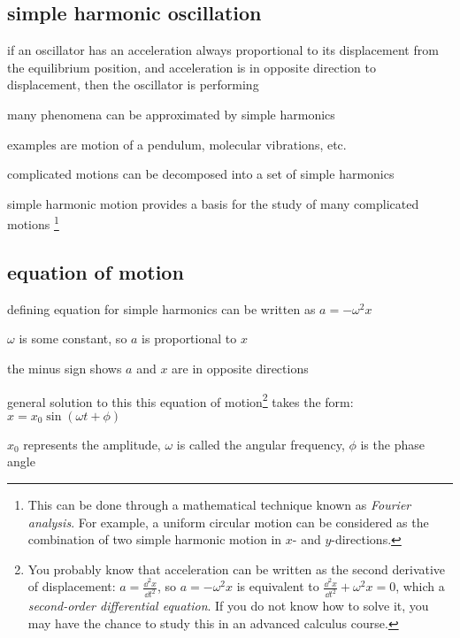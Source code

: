 \subsection{simple harmonic oscillation}

\begin{ilight}
	if an oscillator has an acceleration always proportional to its displacement from the equilibrium position, and acceleration is in opposite direction to displacement, then the oscillator is performing 
\end{ilight}

many phenomena can be approximated by simple harmonics

examples are motion of a pendulum, molecular vibrations, etc.

complicated motions can be decomposed into a set of simple harmonics

simple harmonic motion provides a basis for the study of many complicated motions
\footnote{This can be done through a mathematical technique known as \emph{Fourier analysis}. For example, a uniform circular motion can be considered as the combination of two simple harmonic motion in $x$- and $y$-directions.}

\subsection{equation of motion}

defining equation for simple harmonics can be written as $\boxed{a=-\omega^2 x}$

$\omega$ is some constant, so $a$ is proportional to $x$

the minus sign shows $a$ and $x$ are in opposite directions

\vspace*{\baselineskip} 

general solution to this this equation of motion\footnote{You probably know that acceleration can be written as the second derivative of displacement: $a=\frac{\dd^2 x}{\dd t^2}$, so $a=-\omega^2 x$ is equivalent to $\frac{\dd^2 x}{\dd t^2} + \omega^2 x = 0$, which a \emph{second-order differential equation}. If you do not know how to solve it, you may have the chance to study this in an advanced calculus course.} takes the form: $\boxed{x=x_0\sin(\omega t+\phi)}$

$x_0$ represents the amplitude, $\omega$ is called the angular frequency, $\phi$ is the phase angle

